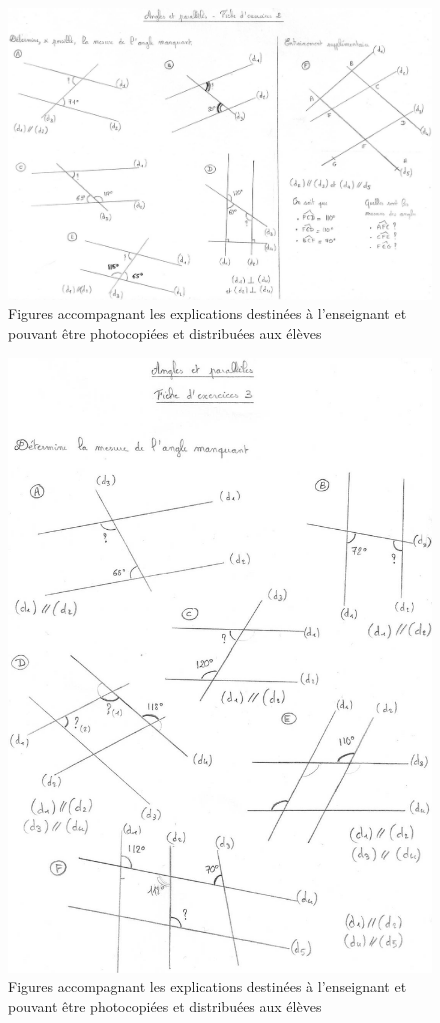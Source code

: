 \begin{figure}[h!]
    \centering
    \includegraphics[width=0.8\linewidth]{img/anglesfiche2.jpg}
    \caption{Figures accompagnant les explications destinées à l'enseignant et pouvant être photocopiées et distribuées aux élèves}
    \label{fig:angles-fiche1}
\end{figure}

\begin{figure}[h!]
    \centering
    \includegraphics[width=0.6\linewidth]{img/anglesfiche3.jpg}
    \caption{Figures accompagnant les explications destinées à l'enseignant et pouvant être photocopiées et distribuées aux élèves}
    \label{fig:angles-fiche1}
\end{figure}

\clearpage

